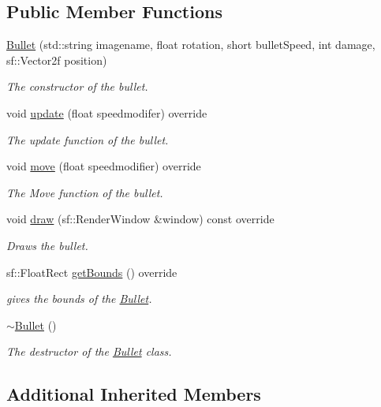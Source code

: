 \subsection*{Public Member Functions}
\begin{DoxyCompactItemize}
\item 
\hyperlink{class_bullet_a181d413f4a8195bc42fce2b5a77f9bd0}{Bullet} (std\+::string imagename, float rotation, short bullet\+Speed, int damage, sf\+::\+Vector2f position)
\begin{DoxyCompactList}\small\item\em The constructor of the bullet. \end{DoxyCompactList}\item 
void \hyperlink{class_bullet_acfcfcf7146d04ad78520292c55ca6eee}{update} (float speedmodifer) override
\begin{DoxyCompactList}\small\item\em The update function of the bullet. \end{DoxyCompactList}\item 
void \hyperlink{class_bullet_ac1d4f701d0eb4a2ff0eb30c68ce545da}{move} (float speedmodifier) override
\begin{DoxyCompactList}\small\item\em The Move function of the bullet. \end{DoxyCompactList}\item 
void \hyperlink{class_bullet_a196f55015a331416e3f406d8d2065f36}{draw} (sf\+::\+Render\+Window \&window) const override
\begin{DoxyCompactList}\small\item\em Draws the bullet. \end{DoxyCompactList}\item 
sf\+::\+Float\+Rect \hyperlink{class_bullet_ac713e5b80340e69140494df3451c4be6}{get\+Bounds} () override
\begin{DoxyCompactList}\small\item\em gives the bounds of the \hyperlink{class_bullet}{Bullet}. \end{DoxyCompactList}\item 
\hyperlink{class_bullet_aaeb5cb41d7db89f49007b08b41f1bfcf}{$\sim$\+Bullet} ()
\begin{DoxyCompactList}\small\item\em The destructor of the \hyperlink{class_bullet}{Bullet} class. \end{DoxyCompactList}\end{DoxyCompactItemize}
\subsection*{Additional Inherited Members}


